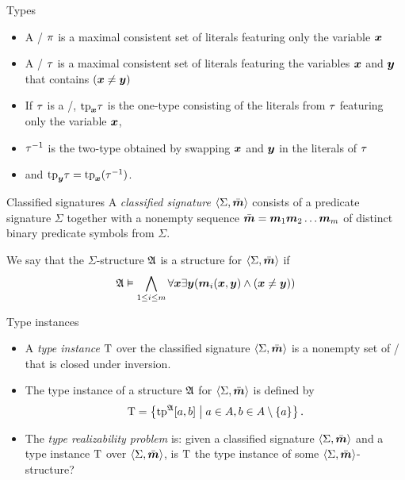 \documentclass{beamer}
\begin{document}
\begin{frame}{Types}
\begin{itemize}
  \item A \onetype/ $\pi$ is a maximal consistent set of literals featuring
  only the variable $\bm{x}$
  \item A \twotype/ $\tau$ is a maximal consistent set of literals featuring the
  variables $\bm{x}$ and $\bm{y}$ that contains $(\bm{x}\neq\bm{y})$
\begin{center}
\end{center}
  \item If $\tau$ is a \twotype/, $\mathrm{tp}_{\bm{x}}\tau$ is the one-type consisting of the
  literals from $\tau$ featuring only the variable $\bm{x}$,
  \item $\tau^{-1}$ is the two-type obtained by swapping $\bm{x}$ and $\bm{y}$ in the
  literals of $\tau$
  \item and $\mathrm{tp}_{\bm{y}}\tau=\mathrm{tp}_{\bm{x}}(\tau^{-1})$.
\end{itemize}
\end{frame}

\begin{frame}{Classified signatures}
A \emph{classified signature} $\left\langle \Sigma,\bar{\bm{m}} \right\rangle$ consists of a predicate
signature $\Sigma$ together with a nonempty sequence
$\sms=\smm1\smm2\dots\smm\nm$ of distinct binary predicate symbols from $\Sigma$.

We say that the $\Sigma$-structure $\mathfrak{A}$ is a structure for $\left\langle \Sigma,\bar{\bm{m}} \right\rangle$
if
\[
\mathfrak{A}\vDash\bigwedge_{1\leq i\leq m}\forall\bm{x}\exists\bm{y}
(\bm{m}_{i}(\bm{x},\bm{y})\land(\bm{x}\neq\bm{y}))
\]
\end{frame}

\begin{frame}{Type instances}
\begin{itemize}
  \item 
  A \emph{type instance} $\mathrm{T}$ over the classified signature $\left\langle \Sigma,\bar{\bm{m}} \right\rangle$
  is a nonempty set of \twotypes/ that is closed under inversion.

  \item 
  The type instance of a structure $\mathfrak{A}$ for $\left\langle \Sigma,\bar{\bm{m}} \right\rangle$ is defined by
  \[
  \mathrm{T} = \left\{\operatorname{tp}^{\mathfrak{A}}[a,b]\mathrel{}\middle|\mathrel{}a\in A,b\in A\setminus\left\{a\right\}\right\}.
  \]

  \item The \emph{type realizability problem} is: given a classified signature
  $\left\langle \Sigma,\bar{\bm{m}} \right\rangle$ and a type instance $\mathrm{T}$ over $\left\langle \Sigma,\bar{\bm{m}} \right\rangle$,
  is $\mathrm{T}$ the type instance of some $\left\langle \Sigma,\bar{\bm{m}} \right\rangle$-structure?
\end{itemize}
\end{frame}
\end{document}
